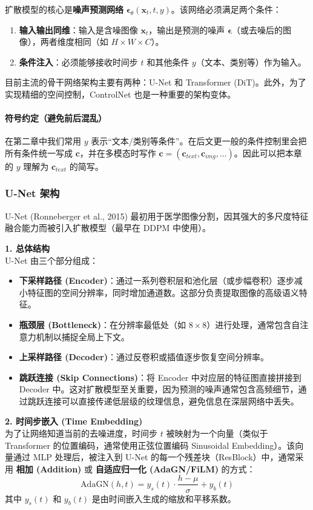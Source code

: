 \documentclass[zihao=-4, fontset=windows]{ctexart}
\begin{document}
扩散模型的核心是\textbf{噪声预测网络} $\boldsymbol{\epsilon}_\theta(\mathbf{x}_t, t, y)$。该网络必须满足两个条件：
\begin{enumerate}
    \item \textbf{输入输出同维}：输入是含噪图像 $\mathbf{x}_t$，输出是预测的噪声 $\boldsymbol{\epsilon}$（或去噪后的图像），两者维度相同（如 $H \times W \times C$）。
    \item \textbf{条件注入}：必须能够接收时间步 $t$ 和其他条件 $y$（文本、类别等）作为输入。
\end{enumerate}

目前主流的骨干网络架构主要有两种：U-Net 和 Transformer (DiT)。此外，为了实现精细的空间控制，ControlNet 也是一种重要的架构变体。

\paragraph{符号约定（避免前后混乱）}
在第二章中我们常用 $y$ 表示“文本/类别等条件”。在后文更一般的条件控制里会把所有条件统一写成 $\mathbf{c}$，并在多模态时写作 $\mathbf{c}=(\mathbf{c}_{text},\mathbf{c}_{img},\ldots)$。因此可以把本章的 $y$ 理解为 $\mathbf{c}_{text}$ 的简写。

\subsubsection{U-Net 架构}
U-Net (Ronneberger et al., 2015) 最初用于医学图像分割，因其强大的多尺度特征融合能力而被引入扩散模型（最早在 DDPM 中使用）。

\textbf{1. 总体结构} \\
U-Net 由三个部分组成：
\begin{itemize}
    \item \textbf{下采样路径 (Encoder)}：通过一系列卷积层和池化层（或步幅卷积）逐步减小特征图的空间分辨率，同时增加通道数。这部分负责提取图像的高级语义特征。
    \item \textbf{瓶颈层 (Bottleneck)}：在分辨率最低处（如 $8 \times 8$）进行处理，通常包含自注意力机制以捕捉全局上下文。
    \item \textbf{上采样路径 (Decoder)}：通过反卷积或插值逐步恢复空间分辨率。
    \item \textbf{跳跃连接 (Skip Connections)}：将 Encoder 中对应层的特征图直接拼接到 Decoder 中。这对扩散模型至关重要，因为预测的噪声通常包含高频细节，通过跳跃连接可以直接传递低层级的纹理信息，避免信息在深层网络中丢失。
\end{itemize}

\textbf{2. 时间步嵌入 (Time Embedding)} \\
为了让网络知道当前的去噪进度，时间步 $t$ 被映射为一个向量（类似于 Transformer 的位置编码，通常使用正弦位置编码 Sinusoidal Embedding）。该向量通过 MLP 处理后，被注入到 U-Net 的每一个残差块（ResBlock）中，通常采用 \textbf{相加 (Addition)} 或 \textbf{自适应归一化 (AdaGN/FiLM)} 的方式：
\begin{equation}
    \text{AdaGN}(h, t) = y_s(t) \cdot \frac{h - \mu}{\sigma} + y_b(t)
\end{equation}
其中 $y_s(t)$ 和 $y_b(t)$ 是由时间嵌入生成的缩放和平移系数。
\end{document}

